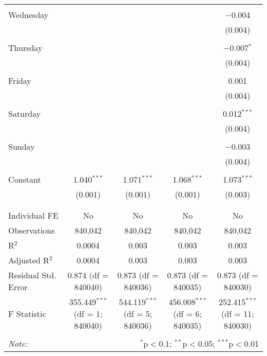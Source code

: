 \documentclass[
]{article}
\begin{document}
\begin{table}[!htbp]
{\begin{tabular}{@{\extracolsep{5pt}}lcccc}
  & & & & \\ 
 Wednesday &  &  &  & $-$0.004 \\ 
  &  &  &  & (0.004) \\ 
  & & & & \\ 
 Thursday &  &  &  & $-$0.007$^{*}$ \\ 
  &  &  &  & (0.004) \\ 
  & & & & \\ 
 Friday &  &  &  & 0.001 \\ 
  &  &  &  & (0.004) \\ 
  & & & & \\ 
 Saturday &  &  &  & 0.012$^{***}$ \\ 
  &  &  &  & (0.004) \\ 
  & & & & \\ 
 Sunday &  &  &  & $-$0.003 \\ 
  &  &  &  & (0.004) \\ 
  & & & & \\ 
 Constant & 1.040$^{***}$ & 1.071$^{***}$ & 1.068$^{***}$ & 1.073$^{***}$ \\ 
  & (0.001) & (0.001) & (0.001) & (0.003) \\ 
  & & & & \\ 
\hline \\[-1.8ex] 
Individual FE & No & No & No & No \\ 
Observations & 840,042 & 840,042 & 840,042 & 840,042 \\ 
R$^{2}$ & 0.0004 & 0.003 & 0.003 & 0.003 \\ 
Adjusted R$^{2}$ & 0.0004 & 0.003 & 0.003 & 0.003 \\ 
Residual Std. Error & 0.874 (df = 840040) & 0.873 (df = 840036) & 0.873 (df = 840035) & 0.873 (df = 840030) \\ 
F Statistic & 355.449$^{***}$ (df = 1; 840040) & 544.119$^{***}$ (df = 5; 840036) & 456.008$^{***}$ (df = 6; 840035) & 252.415$^{***}$ (df = 11; 840030) \\ 
\hline 
\hline \\[-1.8ex] 
\textit{Note:}  & \multicolumn{4}{r}{$^{*}$p$<$0.1; $^{**}$p$<$0.05; $^{***}$p$<$0.01} \\ 
\end{tabular}
} 
\end{table} 
\newpage
\end{document}
